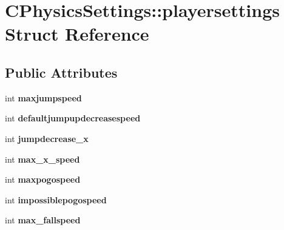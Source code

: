 \hypertarget{struct_c_physics_settings_1_1playersettings}{
\section{CPhysicsSettings::playersettings Struct Reference}
\label{struct_c_physics_settings_1_1playersettings}
}
\subsection*{Public Attributes}
\begin{DoxyCompactItemize}
\item 
\hypertarget{struct_c_physics_settings_1_1playersettings_a7fb969d664125310fcea8a419638eb22}{
int {\bfseries maxjumpspeed}}
\label{struct_c_physics_settings_1_1playersettings_a7fb969d664125310fcea8a419638eb22}

\item 
\hypertarget{struct_c_physics_settings_1_1playersettings_ab1fcf87959f6a7b20c3300e62e814cb3}{
int {\bfseries defaultjumpupdecreasespeed}}
\label{struct_c_physics_settings_1_1playersettings_ab1fcf87959f6a7b20c3300e62e814cb3}

\item 
\hypertarget{struct_c_physics_settings_1_1playersettings_a3bc6b3e71cc21f70750196000e50b117}{
int {\bfseries jumpdecrease\_\-x}}
\label{struct_c_physics_settings_1_1playersettings_a3bc6b3e71cc21f70750196000e50b117}

\item 
\hypertarget{struct_c_physics_settings_1_1playersettings_a53ec0048c978129e0fda4b502c922a45}{
int {\bfseries max\_\-x\_\-speed}}
\label{struct_c_physics_settings_1_1playersettings_a53ec0048c978129e0fda4b502c922a45}

\item 
\hypertarget{struct_c_physics_settings_1_1playersettings_a0d6bf50244eaebccef876486da85403d}{
int {\bfseries maxpogospeed}}
\label{struct_c_physics_settings_1_1playersettings_a0d6bf50244eaebccef876486da85403d}

\item 
\hypertarget{struct_c_physics_settings_1_1playersettings_a2973e2a791606d5503e02bf911384c89}{
int {\bfseries impossiblepogospeed}}
\label{struct_c_physics_settings_1_1playersettings_a2973e2a791606d5503e02bf911384c89}

\item 
\hypertarget{struct_c_physics_settings_1_1playersettings_aea12d934164baf38b5e9c7e63de0fdd4}{
int {\bfseries max\_\-fallspeed}}
\label{struct_c_physics_settings_1_1playersettings_aea12d934164baf38b5e9c7e63de0fdd4}


\end{DoxyCompactItemize}

